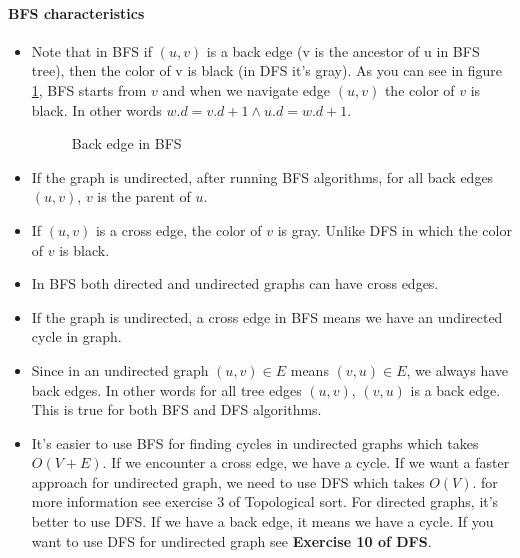 \documentclass{book}
\begin{document}
	\label{psec:BFScharacteristics}
	\paragraph{BFS characteristics}
	\begin{itemize}
		\item Note that in BFS if $(u, v)$ is a back edge (v is the ancestor of u in BFS tree), then the color of v is black (in DFS it's gray). As you can see in figure \ref{fig:BackEdgeInBfs}, BFS starts from $v$ and when we navigate edge $(u, v)$ the color of $v$ is black. In other words $w.d = v.d + 1 \land u.d = w.d + 1$.
		
		\begin{figure}[h!]
			\centering
			\caption{Back edge in BFS}
			\label{fig:BackEdgeInBfs}
		\end{figure}
		\FloatBarrier

		\item If the graph is undirected, after running BFS algorithms, for all back edges $(u, v)$, $v$ is the parent of $u$.				
		\item If $(u, v)$ is a cross edge, the color of $v$ is gray. Unlike DFS in which the color of $v$ is black.
		
		\item In BFS both directed and undirected graphs can have cross edges.
		
		\item If the graph is undirected, a cross edge in BFS means we have an undirected cycle in graph.
		
		\item Since in an undirected graph $(u, v) \in E$ means $(v, u) \in E$, we always have back edges. In other words for all tree edges $(u, v)$, $(v, u)$ is a back edge. This is true for both BFS and DFS algorithms.
		
		\item It's easier to use BFS for finding cycles in undirected graphs which takes $O(V + E)$. If we encounter a cross edge, we have a cycle. If we want a faster approach for undirected graph, we need to use DFS which takes $O(V)$. for more information see exercise 3 of Topological sort. For directed graphs, it's better to use DFS. If we have a back edge, it means we have a cycle. If you want to use DFS for undirected graph see \textbf{Exercise 10 of DFS}.
	 
	\end{itemize}
		
\end{document}
